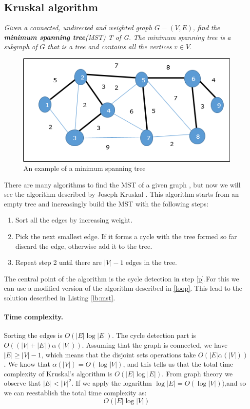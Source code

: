 \documentclass{article}
\begin{document}
\subsection{Kruskal algorithm}
\emph{Given a connected, undirected  and weighted  graph $G = (V,E)$,
find  the \textbf{minimum spanning tree}(MST) T  of G. The minimum spanning tree 
is a subgraph of $G$ that is a tree and contains all the vertices $v \in V$}.
    
\bigskip
\begin{figure}[h!]
    \centering
    \includegraphics[scale=0.8]{img/mst.png}
    \caption{An example of a minimum spanning tree}
\end{figure}
There are many algorithms to find the MST of a given graph \cite{prim1957shortest} \cite{nevsetvril2001otakar},
but now we will see the algorithm described by Joseph Kruskal \cite{kruskal1956shortest}.
This algorithm starts from an empty tree and increasingly build the MST with the following steps:
\begin{enumerate}
    \item Sort all the edges by increasing weight.
    \item \label{p}Pick the next smallest edge. If it forms a cycle with the  tree formed so far discard the edge, otherwise
    add it to the tree.
    \item Repeat step 2 until there are $|V| - 1$ edges in the tree.
\end{enumerate}
The central point of the algorithm is the cycle detection in step \ref{p}.For this we can use a modified version of the algorithm described in \ref{loop}.
This lead to the solution described in Listing \ref{lb:mst}. 
\paragraph{Time complexity.} Sorting the edges is $O(|E|\log|E|)$. The cycle detection
part is $O((|V| + |E|)\alpha(|V|))$. Assuming that the graph is connected, we have
 $|E| \geq |V| - 1$, which means that the disjoint sets operations take $O(|E|\alpha(|V|))$. We know that
 $\alpha(|V|) = O(\log|V|)$, and this tells us that the total time complexity of Kruskal's algorithm
 is $O(|E|\log|E|)$. From graph theory we observe that $|E| < |V|^2$. If we apply the logarithm 
 $\log|E| = O(\log|V|))$,and so we can reestablish the total time complexity as:
 $$O(|E|\log|V|)$$
\end{document}
